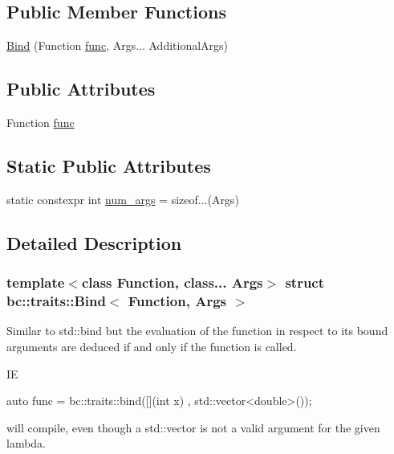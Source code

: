 \subsection*{Public Member Functions}
\begin{DoxyCompactItemize}
\item 
\hyperlink{structbc_1_1traits_1_1Bind_a1969900854a26d59661d5b9c159d7fc4}{Bind} (Function \hyperlink{structbc_1_1traits_1_1Bind_ac7c74786597ebc607ba416eb842a184d}{func}, Args... Additional\+Args)
\end{DoxyCompactItemize}
\subsection*{Public Attributes}
\begin{DoxyCompactItemize}
\item 
Function \hyperlink{structbc_1_1traits_1_1Bind_ac7c74786597ebc607ba416eb842a184d}{func}
\end{DoxyCompactItemize}
\subsection*{Static Public Attributes}
\begin{DoxyCompactItemize}
\item 
static constexpr int \hyperlink{structbc_1_1traits_1_1Bind_a77891c8bf25f4fc19e2b226cf906a7a8}{num\+\_\+args} = sizeof...(Args)
\end{DoxyCompactItemize}


\subsection{Detailed Description}
\subsubsection*{template$<$class Function, class... Args$>$\newline
struct bc\+::traits\+::\+Bind$<$ Function, Args $>$}

Similar to std\+::bind but the evaluation of the function in respect to its bound arguments are deduced if and only if the function is called. 

IE \begin{DoxyVerb}auto func = bc::traits::bind([](int x) {}, std::vector<double>());

will compile, even though a std::vector is not a valid argument
for the given lambda.\end{DoxyVerb}
 

